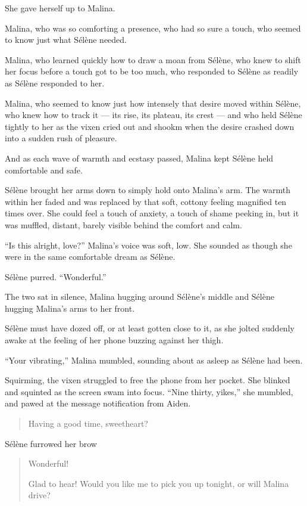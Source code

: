 She gave herself up to Malina.

Malina, who was so comforting a presence, who had so sure a touch, who seemed to know just what Sélène needed.

Malina, who learned quickly how to draw a moan from Sélène, who knew to shift her focus before a touch got to be too much, who responded to Sélène as readily as Sélène responded to her.

Malina, who seemed to know just how intensely that desire moved within Sélène, who knew how to track it --- its rise, its plateau, its crest --- and who held Sélène tightly to her as the vixen cried out and shookm when the desire crashed down into a sudden rush of pleasure.

And as each wave of warmth and ecstasy passed, Malina kept Sélène held comfortable and safe.

Sélène brought her arms down to simply hold onto Malina's arm. The warmth within her faded and was replaced by that soft, cottony feeling magnified ten times over. She could feel a touch of anxiety, a touch of shame peeking in, but it was muffled, distant, barely visible behind the comfort and calm.

``Is this alright, love?'' Malina's voice was soft, low. She sounded as though she were in the same comfortable dream as Sélène.

Sélène purred. ``Wonderful.''

The two sat in silence, Malina hugging around Sélène's middle and Sélène hugging Malina's arms to her front.

\secdiv{}

\noindent Sélène must have dozed off, or at least gotten close to it, as she jolted suddenly awake at the feeling of her phone buzzing against her thigh.

``Your vibrating,'' Malina mumbled, sounding about as asleep as Sélène had been.

Squirming, the vixen struggled to free the phone from her pocket. She blinked and squinted as the screen swam into focus. ``Nine thirty, yikes,'' she mumbled, and pawed at the message notification from Aiden.

\begin{quote}
 Having a good time, sweetheart?
\end{quote}

Sélène furrowed her brow

\begin{quote}
 Wonderful!

 Glad to hear! Would you like me to pick you up tonight, or will Malina drive?
\end{quote}

